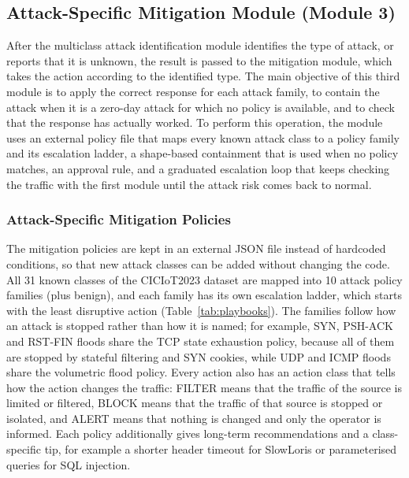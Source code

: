 \documentclass[]{interact}
\theoremstyle{plain}%
\theoremstyle{definition}
\theoremstyle{remark}
\begin{document}
\subsection{Attack-Specific Mitigation Module (Module 3)}
After the multiclass attack identification module identifies the type of attack, or reports that it is unknown, the result is passed to the mitigation module, which takes the action according to the identified type. The main objective of this third module is to apply the correct response for each attack family, to contain the attack when it is a zero-day attack for which no policy is available, and to check that the response has actually worked. To perform this operation, the module uses an external policy file that maps every known attack class to a policy family and its escalation ladder, a shape-based containment that is used when no policy matches, an approval rule, and a graduated escalation loop that keeps checking the traffic with the first module until the attack risk comes back to normal.

\subsubsection{Attack-Specific Mitigation Policies}
The mitigation policies are kept in an external JSON file instead of hardcoded conditions, so that new attack classes can be added without changing the code. All 31 known classes of the CICIoT2023 dataset are mapped into 10 attack policy families (plus benign), and each family has its own escalation ladder, which starts with the least disruptive action (Table~\ref{tab:playbooks}). The families follow how an attack is stopped rather than how it is named; for example, SYN, PSH-ACK and RST-FIN floods share the TCP state exhaustion policy, because all of them are stopped by stateful filtering and SYN cookies, while UDP and ICMP floods share the volumetric flood policy. Every action also has an action class that tells how the action changes the traffic: FILTER means that the traffic of the source is limited or filtered, BLOCK means that the traffic of that source is stopped or isolated, and ALERT means that nothing is changed and only the operator is informed. Each policy additionally gives long-term recommendations and a class-specific tip, for example a shorter header timeout for SlowLoris or parameterised queries for SQL injection.
\end{document}
